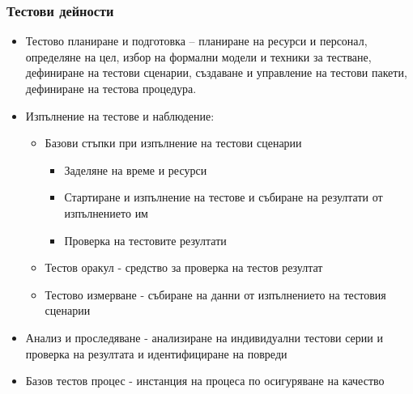 \documentclass[fleqn,12pt]{article}
\begin{document}
\begin{flushleft}
\subsubsection{Тестови дейности}
    \begin{itemize}
        \item Тестово планиране и подготовка -- планиране на ресурси и персонал, определяне на цел, избор на формални модели и техники за тестване,\\
        дефиниране на тестови сценарии, създаване и управление на тестови пакети, дефиниране на тестова процедура.
        \item Изпълнение на тестове и наблюдение:
        \begin{itemize}
            \item Базови стъпки при изпълнение на тестови сценарии
            \begin{itemize}
                \item Заделяне на време и ресурси
                \item Стартиране и изпълнение на тестове и събиране на резултати от изпълнението им
                \item Проверка на тестовите резултати
            \end{itemize}
            \item Тестов оракул - средство за проверка на тестов резултат
            \item Тестово измерване - събиране на данни от изпълнението на тестовия сценарии
        \end{itemize}
        \item Анализ и проследяване - анализиране на индивидуални тестови серии и проверка на резултата и идентифициране на повреди
        \item Базов тестов процес - инстанция на процеса по осигуряване на качество
    \end{itemize}


\end{flushleft}
\end{document}
